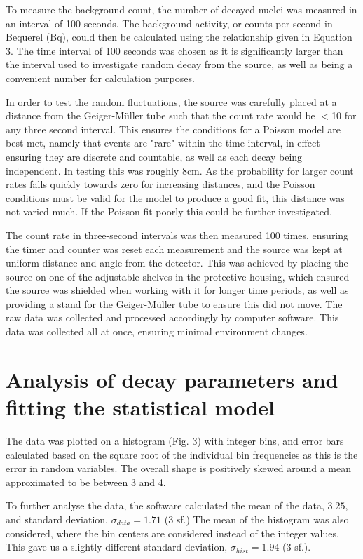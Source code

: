 \documentclass[11pt]{article}
\begin{document}
\noindent To measure the background count, the number of decayed nuclei was measured in an interval of 100 seconds. The background activity, or counts per second in Bequerel (Bq), could then be calculated using the relationship given in Equation 3. The time interval of 100 seconds was chosen as it is significantly larger than the interval used to investigate random decay from the source, as well as being a convenient number for calculation purposes.

\noindent In order to test the random fluctuations, the  source was carefully placed at a distance from the Geiger-Müller tube such that the count rate would be $<$10 for any three second interval. This ensures the conditions for a Poisson model are best met, namely that events are "rare" within the time interval, in effect ensuring they are discrete and countable, as well as each decay being independent. In testing this was roughly 8cm. As the probability for larger count rates falls quickly towards zero for increasing distances, and the Poisson conditions must be valid for the model to produce a good fit, this distance was not varied much. If the Poisson fit poorly this could be further investigated.

\noindent The count rate in three-second intervals was then measured 100 times, ensuring the timer and counter was reset each measurement and the source was kept at uniform distance and angle from the detector. This was achieved by placing the source on one of the adjustable shelves in the protective housing, which ensured the source was shielded when working with it for longer time periods, as well as providing a stand for the Geiger-Müller tube to ensure this did not move. The raw data was collected and processed accordingly by computer software. This data was collected all at once, ensuring minimal environment changes.
\section{Analysis of decay parameters and fitting the statistical model}
The data was plotted on a histogram (Fig. 3) with integer bins, and error bars calculated based on the square root of the individual bin frequencies as this is the error in random variables.  The overall shape is positively skewed around a mean approximated to be between 3 and 4.

\noindent To further analyse the data, the software calculated the mean of the data, $3.25$, and standard deviation, $\sigma_{data} = 1.71 $ (3 sf.)
The mean of the histogram was also considered, where the bin centers are considered instead of the integer values. This gave us a slightly different standard deviation, $\sigma_{hist} = 1.94$ (3 sf.). 
\end{document}
